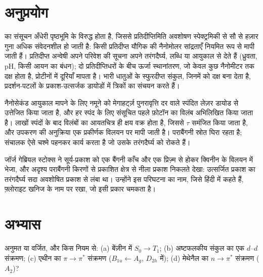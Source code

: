 \section{अनुप्रयोग}

 का संसूचन अँधेरी पृष्ठभूमि के विरुद्ध होता है, जिससे प्रतिदीप्तिमिति
अवशोषण स्पेक्ट्रमिकी से सौ से हज़ार गुना अधिक संवेदनशील हो जाती है:
किसी प्रतिदीप्त यौगिक की नैनोमोलर सांद्रताएँ नियमित रूप से मापी जाती हैं।
प्रतिदीप्त अन्वेषी अपने परिवेश की सूचना अपने तरंगदैर्घ्य,
लब्धि या आयुकाल से देते हैं (ध्रुवता, pH, किसी आयन का बंधन); दो प्रतिदीप्तिधरों के बीच
ऊर्जा स्थानांतरण, जो केवल कुछ नैनोमीटर तक दक्ष होता है, प्रोटीनों में
दूरियाँ मापता है। भारी धातुओं के स्फुरदीप्त संकुल, जिनमें
  को दक्ष बना देता है, प्रदर्शन-पटलों के
प्रकाश-उत्सर्जक डायोडों में त्रिकों का संचयन करते हैं।

\begin{inthelab}
नैनोसेकंड आयुकाल मापने के लिए नमूने को मेगाहर्ट्ज़ पुनरावृत्ति दर वाले स्पंदित लेज़र
डायोड से उत्तेजित किया जाता है, और हर स्पंद के लिए संसूचित पहले
 फ़ोटॉन का विलंब अभिलिखित किया जाता है। लाखों स्पंदों के बाद
विलंबों का आयतचित्र ही क्षय वक्र होता है, जिससे $\tau$ समंजित किया जाता है, और
उपकरण की अनुक्रिया एक प्रकीर्णक विलयन पर मापी जाती है। पराबैंगनी
स्रोत घिरा रहता है; संचालक ऐसे चश्मे पहनकर कार्य करता है जो उसके
तरंगदैर्घ्य को रोकते हैं।
\end{inthelab}

\begin{history}[स्टोक्स, 1852]
जॉर्ज गेब्रियल स्टोक्स ने सूर्य-प्रकाश को एक बैंगनी काँच और एक प्रिज़्म से होकर
क्विनीन के विलयन में भेजा, और अदृश्य पराबैंगनी किरणों से प्रकाशित क्षेत्र से नीला प्रकाश
निकलते देखा: उत्सर्जित प्रकाश का तरंगदैर्घ्य सदा अवशोषित प्रकाश से
लंबा था। उन्होंने इस परिघटना का नाम, जिसे हिंदी में  कहते हैं, फ़्लोराइट खनिज के
नाम पर रखा, जो इसी प्रकार चमकता है।
\end{history}

\section{अभ्यास}

\begin{exercise}[$\star$]\label{exo:b3:electronic-spectroscopy:1}
अनुमत या वर्जित, और किस नियम से: (a) बेंज़ीन में $S_0 \to T_1$; (b) अष्टफलकीय
संकुल का एक $d$--$d$ संक्रमण; (c) एथीन का $\pi\to\pi^*$ संक्रमण
($B_{1u} \leftarrow A_g$, $D_{2h}$ में); (d) मेथेनैल का $n\to\pi^*$ संक्रमण
($A_2$)?
\end{exercise}

